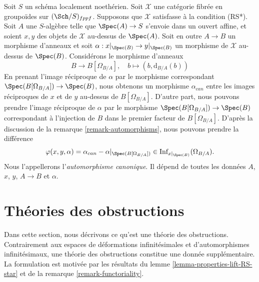 \begin{remark}
\label{remark-canonical-isomorphism}
Soit $S$ un schéma localement noethérien. Soit $\mathcal{X}$ une catégorie
fibrée en groupoïdes sur $(\Sch/S)_{fppf}$. Supposons que $\mathcal{X}$
satisfasse à la condition (RS*). Soit $A$ une $S$-algèbre telle que
$\Spec(A) \to S$ s'envoie dans un ouvert affine, et soient $x, y$ des objets
de $\mathcal{X}$ au-dessus de $\Spec(A)$. Soit en outre $A \to B$ un morphisme
d'anneaux et soit $\alpha : x|_{\Spec(B)} \to y|_{\Spec(B)}$ un morphisme de
$\mathcal{X}$ au-dessus de $\Spec(B)$. Considérons le morphisme d'anneaux
$$
B \longrightarrow B[\Omega_{B/A}],
\quad
b \longmapsto (b, \text{d}_{B/A}(b))
$$
En prenant l'image réciproque de $\alpha$ par le morphisme correspondant
$\Spec(B[\Omega_{B/A}]) \to \Spec(B)$, nous obtenons un morphisme
$\alpha_{can}$ entre les images réciproques de $x$ et de $y$ au-dessus de
$B[\Omega_{B/A}]$. D'autre part, nous pouvons prendre l'image réciproque de
$\alpha$ par le morphisme $\Spec(B[\Omega_{B/A}]) \to \Spec(B)$ correspondant
à l'injection de $B$ dans le premier facteur de $B[\Omega_{B/A}]$. D'après la
discussion de la remarque \ref{remark-automorphisms}, nous pouvons prendre la
différence
$$
\varphi(x, y, \alpha) = \alpha_{can} - \alpha|_{\Spec(B[\Omega_{B/A}])} \in
\text{Inf}_{x|_{\Spec(B)}}(\Omega_{B/A}).
$$
Nous l'appellerons l'{\it automorphisme canonique}. Il dépend de toutes les
données $A$, $x$, $y$, $A \to B$ et $\alpha$.
\end{remark}





\section{Théories des obstructions}
\label{section-obstruction-theory}

\noindent
Dans cette section, nous décrivons ce qu'est une théorie des obstructions.
Contrairement aux espaces de déformations infinitésimales et d'automorphismes
infinitésimaux, une théorie des obstructions constitue une donnée
supplémentaire. La formulation est motivée par les résultats du lemme
\ref{lemma-properties-lift-RS-star} et de la remarque
\ref{remark-functoriality}.

